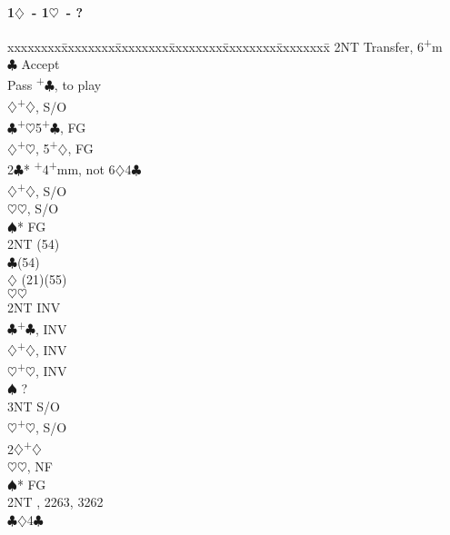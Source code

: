 \documentclass[10pt]{article}
\renewcommand{\c}{$\clubsuit$}
\renewcommand{\d}{$\diamondsuit$}
\newcommand{\h}{$\heartsuit$}
\newcommand{\s}{$\spadesuit$}
\newcommand{\p}{\textsuperscript{+}}
\newenvironment{bidtable}[1][]
{\textbf{#1}
  \begin{adjustwidth}{1em}{}
    \addvspace{2pt}
    \begin{tabbing}
      xxxxxxxx\=xxxxxxxx\=xxxxxxxx\=xxxxxxxx\=xxxxxxxx\=xxxxxxxx\=\kill}
{\end{tabbing}\end{adjustwidth}\bigskip}%
\begin{document}
\begin{multicols*}{2}
\begin{bidtable}[1\d\ - 1\h\ - ?]
     \> 2NT  \> Transfer, 6\p m                         \\
     \>      \c \> Accept                           \\
     \>      \>     \> Pass \p\c, to play           \\
     \>      \>     \d  {}\p\d, S/O               \\
     \c  {}\p\h 5\p\c, FG                         \\
     \d  {}\p\h, 5\p\d, FG                        \\
2\c* {}\p 4\p mm, not 6\d 4\c                         \\
     \d  {}\p\d, S/O                              \\
     \h  {}\h, S/O                                \\
     \s* \> FG                                      \\
     \>      \> 2NT (54)                           \\
     \>      \c {}(54)                           \\
     \>      \d \> (21)(55)                         \\
     \>      \h {}\h                              \\
     \> 2NT  \> INV                                     \\
     \c  {}\p\c, INV                              \\
     \d  {}\p\d, INV                              \\
     \h  {}\p\h, INV                              \\
     \s  \> ?                                       \\
     \> 3NT  \> S/O                                     \\
     \h  {}\p\h, S/O                              \\
2\d  {}\p\d                                    \\
     \h  {}\h, NF                                 \\
     \s* \> FG                                      \\
     \>      \> 2NT , 2263, 3262                 \\
     \>      \c {}\d 4\c                          \\

\end{bidtable}
\end{multicols*}
\end{document}
